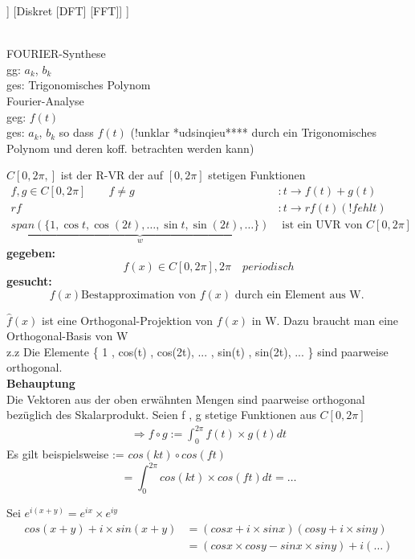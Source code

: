 	\begin{forest}
	[FOURIER-Theorie 
	[	kontinuierlich[Fourier-Reihen]  ]
	[Diskret [DFT] [FFT]]
	]
\end{forest}\\

\newpage
FOURIER-Synthese\\
gg: $a_k$, $b_k$\\
ges: Trigonomisches Polynom\\
Fourier-Analyse\\
geg: $f(t)$\\
ges: $a_k$, $b_k$ so dass $f(t)$ (!unklar *udsinqieu**** durch ein Trigonomisches Polynom und deren koff. betrachten werden kann)\\
\begin{remark}
$	C[0,2\pi,]$ ist der R-VR der auf $[0,2\pi]$ stetigen Funktionen \\

 \begin{align*}
f,g \in C[0,2\pi] \qquad f \neq g &: t \rightarrow f(t) + g(t)\\
r f &:t \rightarrow rf(t)  (!fehlt)\\
\underbrace{span( \{ 1,\cos t , \cos(2t),\dots,\sin t,\sin (2t),\dots   \}) }_{w}&\text{ ist ein UVR von }  C[0,2\pi]
\end{align*}
\textbf{gegeben:} 
\[ f(x) \in  C[0,2\pi] , 2\pi \quad periodisch   \]
\textbf{gesucht:} \[ f(x) \text{Bestapproximation von } f(x)  \text{ durch ein Element aus W. } \]  
\end{remark}
$\hat{f}(x)$ ist eine Orthogonal-Projektion von $f(x)$ in W. Dazu braucht man eine Orthogonal-Basis von W \\
z.z Die Elemente \{ 1 , cos(t) , cos(2t), ... , sin(t) , sin(2t), ... \} sind paarweise orthogonal.\\
\textbf{Behauptung}\\
Die Vektoren aus der oben erwähnten Mengen sind paarweise orthogonal bezüglich des Skalarprodukt.
Seien f , g stetige Funktionen aus $C[0,2 \pi]$  
\begin{align*}

\Rightarrow f \circ  g := \int_{0}^{2 \pi} {f(t) \times  g(t) dt } 
\end{align*}
Es gilt beispielsweise := $ cos(kt) \circ cos(ft)$
$$ = \int_{0}^{2 \pi} cos (kt) \times cos(ft)dt = \dots  $$
\begin{remark}
Sei $e^{i(x+y)}= e^{ix} \times e^{iy} $
\begin{align*}
cos(x+y) + i \times sin(x+y) &= (cos x + i \times sin x) 
(cos y + i \times sin y)\\
&= (cosx \times cos y - sin x \times sin y ) + i( \dots  )
\end{align*}
\end{remark}
